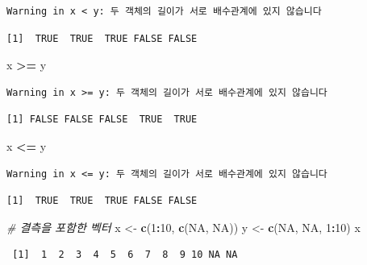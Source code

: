 \documentclass[
  11pt,
]{krantz}
\newenvironment{Shaded}{\begin{snugshade}}{\end{snugshade}}
\newcommand{\CommentTok}[1]{\textcolor[rgb]{0.37,0.37,0.37}{\textit{#1}}}
\newcommand{\DecValTok}[1]{\textcolor[rgb]{0.06,0.06,0.06}{#1}}
\newcommand{\KeywordTok}[1]{\textcolor[rgb]{0.27,0.27,0.27}{\textbf{#1}}}
\newcommand{\NormalTok}[1]{#1}
\newcommand{\OperatorTok}[1]{\textcolor[rgb]{0.43,0.43,0.43}{\textbf{#1}}}
\newcommand{\OtherTok}[1]{\textcolor[rgb]{0.37,0.37,0.37}{#1}}
\newcommand{\StringTok}[1]{\textcolor[rgb]{0.5,0.5,0.5}{#1}}
\begin{document}
\begin{verbatim}
Warning in x < y: 두 객체의 길이가 서로 배수관계에 있지 않습니다
\end{verbatim}

\begin{verbatim}
[1]  TRUE  TRUE  TRUE FALSE FALSE
\end{verbatim}

\begin{Shaded}
\begin{Highlighting}[]
\NormalTok{x }\OperatorTok{>=}\StringTok{ }\NormalTok{y}
\end{Highlighting}
\end{Shaded}

\begin{verbatim}
Warning in x >= y: 두 객체의 길이가 서로 배수관계에 있지 않습니다
\end{verbatim}

\begin{verbatim}
[1] FALSE FALSE FALSE  TRUE  TRUE
\end{verbatim}

\begin{Shaded}
\begin{Highlighting}[]
\NormalTok{x }\OperatorTok{<=}\StringTok{ }\NormalTok{y}
\end{Highlighting}
\end{Shaded}

\begin{verbatim}
Warning in x <= y: 두 객체의 길이가 서로 배수관계에 있지 않습니다
\end{verbatim}

\begin{verbatim}
[1]  TRUE  TRUE  TRUE FALSE FALSE
\end{verbatim}

\begin{Shaded}
\begin{Highlighting}[]
\CommentTok{# 결측을 포함한 벡터}
\NormalTok{x <-}\StringTok{ }\KeywordTok{c}\NormalTok{(}\DecValTok{1}\OperatorTok{:}\DecValTok{10}\NormalTok{, }\KeywordTok{c}\NormalTok{(}\OtherTok{NA}\NormalTok{, }\OtherTok{NA}\NormalTok{))}
\NormalTok{y <-}\StringTok{ }\KeywordTok{c}\NormalTok{(}\OtherTok{NA}\NormalTok{, }\OtherTok{NA}\NormalTok{, }\DecValTok{1}\OperatorTok{:}\DecValTok{10}\NormalTok{)}
\NormalTok{x}
\end{Highlighting}
\end{Shaded}

\begin{verbatim}
 [1]  1  2  3  4  5  6  7  8  9 10 NA NA
\end{verbatim}
\end{document}
